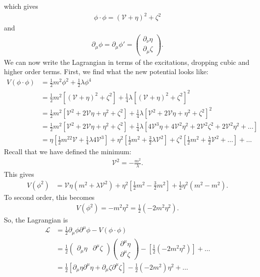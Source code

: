 \documentclass[a4paper,11pt]{article}
\numberwithin{equation}{section}
\theoremstyle{definition}
\newcommand{\p}{\partial}
\newcommand{\lag}{\mathcal{L}}
\begin{document}
which gives
\begin{align}
\phi \cdot \phi = (\mathcal{V} + \eta )^2 + \zeta^2
\end{align}
and 
\begin{align}
\p_\mu\phi = \p_\mu\phi' = \begin{pmatrix}
\p_\nu\eta\\\p_\mu\zeta
\end{pmatrix}.
\end{align}
We can now write the Lagrangian in terms of the excitations, dropping cubic and higher order terms. First, we find what the new potential looks like:
\begin{align}
V(\phi\cdot\phi) &= \frac{1}{2}m^2\phi^2 + \frac{1}{2}\lambda\phi^4\\
&= \frac{1}{2}m^2\left[ (\mathcal{V} + \eta )^2 + \zeta^2  \right] + \frac{1}{4}\lambda\left[ (\mathcal{V} + \eta )^2 + \zeta^2  \right]^2\\
&= \frac{1}{2}m^2\left[\mathcal{V}^2 + 2\mathcal{V}\eta +\eta^2 + \zeta^2\right] + \frac{1}{4}\lambda\left[\mathcal{V}^2 + 2\mathcal{V}\eta +\eta^2 + \zeta^2\right]^2\\
&= \frac{1}{2}m^2\left[\mathcal{V}^2 + 2\mathcal{V}\eta +\eta^2 + \zeta^2\right] + \frac{1}{4}\lambda\left[4\mathcal{V}^3\eta + 4\mathcal{V}^2\eta^2 + 2\mathcal{V}^2\zeta^2 + 2\mathcal{V}^2\eta^2+\dots\right]\\
&= \eta\left[\frac{1}{2}m^22\mathcal{V} + \frac{1}{4}\lambda4\mathcal{V}^3\right] + \eta^2\left[\frac{1}{2}m^2 + \frac{3}{2}\lambda \mathcal{V}^2\right] + \zeta^2 \left[ \frac{1}{2}m^2 + \frac{\lambda}{2}\mathcal{V}^2+\dots \right] + \dots
\end{align}
Recall that we have defined the minimum:
\begin{align}
\mathcal{V}^2 = -\frac{m^2}{\lambda}.
\end{align}
This gives
\begin{align}
V(\phi^2) &= \mathcal{V}\eta(m^2 + \lambda \mathcal{V}^2) + \eta^2\left[\frac{1}{2}m^2 - \frac{3}{2}m^2\right] + \frac{1}{2}\eta^2(m^2 - m^2).
\end{align}
To second order, this becomes
\begin{align}
V(\phi^2) = -m^2\eta^2 = \frac{1}{2}(-2m^2\eta^2).
\end{align}
So, the Lagrangian is
\begin{align}
\lag &= \frac{1}{2}\p_\mu\phi\p^\mu\phi - V(\phi \cdot \phi)\\
&= \frac{1}{2}\begin{pmatrix}
\p_\mu\eta & \p^\mu\zeta
\end{pmatrix}
\begin{pmatrix}
\p^\mu\eta\\ \p^\mu\zeta
\end{pmatrix} - \left[\frac{1}{2}(-2m^2\eta^2)\right] + \dots\\
&= \frac{1}{2}\left[\p_\mu\eta \p^\mu\eta + \p_\mu\zeta \p^\mu\zeta\right] - \frac{1}{2}(-2m^2)\eta^2+\dots
\end{align}
\end{document}
